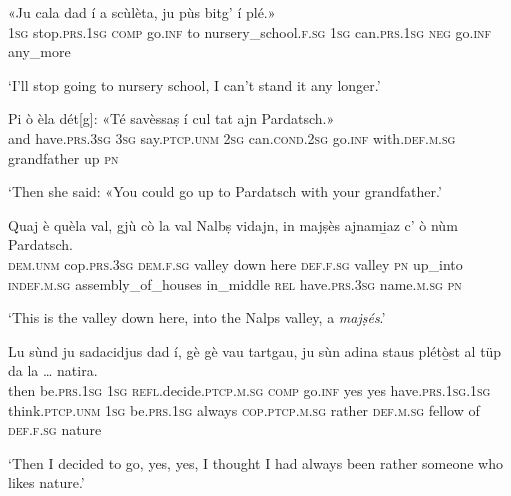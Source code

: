 \begin{linenumbers}
\gll  «Ju cala dad í a scùlèta, ju pùs bitg' í plé.»\\
 \textsc{1sg} stop.\textsc{prs.1sg} \textsc{comp} go.\textsc{inf} to nursery\_school.\textsc{f.sg} \textsc{1sg} can.\textsc{prs.1sg} \textsc{neg} go.\textsc{inf} any\_more  \\
\end{linenumbers}
\medskip
\glt `I’ll stop going to nursery school, I can’t stand it any longer.'
\medskip

\begin{linenumbers}
\gll  Pi ò èla dét[g]: «Té savèssaṣ í cul tat ajn Pardatsch.»  \\
and have.\textsc{prs.3sg} \textsc{3sg} say.\textsc{ptcp.unm} \textsc{2sg} can.\textsc{cond.2sg} go.\textsc{inf} with.\textsc{def.m.sg} grandfather up \textsc{pn}  \\
\end{linenumbers}
\medskip
\glt `Then she said: «You could go up to Pardatsch with your grandfather.'
\medskip

\begin{linenumbers}
\gll Quaj è quèla val, gjù cò la val Nalbṣ vidajn, in majṣès\footnotemark{}  ajnami̱az c' ò nùm Pardatsch.  \\
 \textsc{dem.unm} cop.\textsc{prs.3sg} \textsc{dem.f.sg} valley down here  \textsc{def.f.sg} valley  \textsc{pn} up\_into \textsc{indef.m.sg} assembly\_of\_houses in\_middle \textsc{rel} have.\textsc{prs.3sg} name.\textsc{m.sg} \textsc{pn}\\
\end{linenumbers}
\medskip
\glt `This is the valley down here, into the Nalps valley, a \textit{majṣés}.' 
\medskip

\begin{linenumbers}
\gll  Lu sùnd ju sadacidjus dad í, gè gè vau tartgau, ju sùn adina staus plétò̱st al tüp da la … natira.  \\
then be.\textsc{prs.1sg} \textsc{1sg} \textsc{refl.}decide.\textsc{ptcp.m.sg} \textsc{comp} go.\textsc{inf} yes yes have.\textsc{prs.1sg.1sg} think.\textsc{ptcp.unm} \textsc{1sg} be.\textsc{prs.1sg} always \textsc{cop.ptcp.m.sg} rather \textsc{def.m.sg} fellow of \textsc{def.f.sg} {} nature   \\
\end{linenumbers}
\medskip
\glt `Then I decided to go, yes, yes, I thought I had always been rather someone who likes nature.'
\medskip

